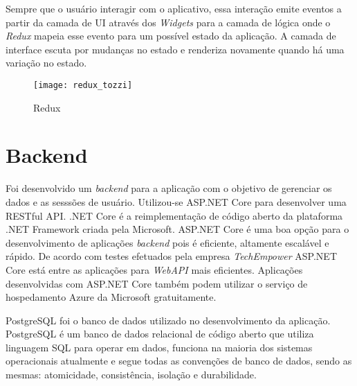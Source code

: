 Sempre que o usuário interagir com o aplicativo, essa interação emite eventos a partir da camada de UI através dos \textit{Widgets} para a camada de lógica onde o \textit{Redux} mapeia esse evento para um possível estado da aplicação. A camada de interface escuta por mudanças no estado e renderiza novamente quando há uma variação no estado.

\begin{figure}[H]
	\caption{\label{fig:redux}Redux}
	\begin{center}
		\texttt{[image: redux\_tozzi]}
	\end{center}
\end{figure}


\section{Backend}
Foi desenvolvido um \textit{backend} para a aplicação com o objetivo de gerenciar os dados e as sesssões de usuário. Utilizou-se ASP.NET Core para desenvolver uma RESTful API. .NET Core é a reimplementação de código aberto da plataforma .NET Framework criada pela Microsoft. ASP.NET Core é uma boa opção para o desenvolvimento de aplicações \textit{backend} pois é eficiente, altamente escalável e rápido. De acordo com testes efetuados pela empresa \textit{TechEmpower} ASP.NET Core está entre as aplicações para \textit{WebAPI} mais eficientes. Aplicações desenvolvidas com ASP.NET Core também podem utilizar o serviço de hospedamento Azure da Microsoft gratuitamente. 

PostgreSQL foi o banco de dados utilizado no desenvolvimento da aplicação. PostgreSQL é um banco de dados relacional de código aberto que utiliza linguagem SQL para operar em dados, funciona na maioria dos sistemas operacionais atualmente e segue todas as convenções de banco de dados, sendo as mesmas: atomicidade, consistência, isolação e durabilidade.

